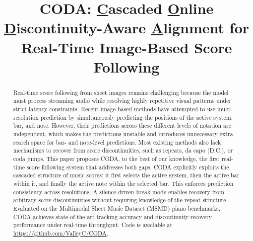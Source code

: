 \documentclass{article}
\title{CODA: \underline{C}ascaded \underline{O}nline \underline{D}iscontinuity-Aware
\underline{A}lignment for Real-Time Image-Based Score Following}
\begin{document}
\maketitle

\begin{abstract}
Real-time score following from sheet images remains challenging because the model must process streaming audio while resolving highly repetitive visual patterns under strict latency constraints. Recent image-based methods have attempted to use multi-resolution prediction by simultaneously predicting the positions of the active system, bar, and note. However, their predictions across these different levels of notation are independent, which makes the predictions unstable and introduces unnecessary extra search space for bar- and note-level predictions. Most existing methods also lack mechanisms to recover from score discontinuities, such as repeats, da capo (D.C.), or coda jumps. This paper proposes CODA, to the best of our knowledge, the first real-time score following system that addresses both gaps. CODA explicitly exploits the cascaded structure of music scores: it first selects the active system, then the active bar within it, and finally the active note within the selected bar. This enforces prediction consistency across resolutions. A silence-driven break mode enables recovery from arbitrary score discontinuities without requiring knowledge of the repeat structure. Evaluated on the Multimodal Sheet Music Dataset (MSMD) piano benchmarks, CODA achieves state-of-the-art tracking accuracy and discontinuity-recovery performance under real-time throughput. Code is available at \url{https://github.com/ValleyC/CODA}.
\end{abstract}

%
%
%
%
%
%


\end{document}
